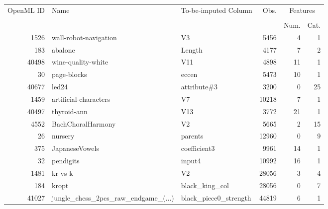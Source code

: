\begin{table}[h!]
\centering
\begin{tabular}{rllrrr}
\toprule
\multirow{2}{*}{OpenML ID} & \multirow{2}{*}{Name} & \multirow{2}{*}{To-be-imputed Column} & \multirow{2}{*}{Obs.} & \multicolumn{2}{c}{Features} \\ \cline{5-6}
\\[-0.75em]
&        &                &                            & Num.    & Cat.   \\
\midrule
      1526 &                    wall-robot-navigation &   V3 &      5456 &                4 &                1 \\
       183 &                                abalone &     Length &    4177 &                7 &                2 \\
     40498 &                     wine-quality-white &     V11 &    4898 &               11 &                1 \\
        30 &                            page-blocks &      eccen &   5473 &               10 &                1 \\
     40677 &                                  led24 &      attribute\#3 &   3200 &                0 &               25 \\
      1459 &                  artificial-characters &    V7 &    10218 &                7 &                1 \\
     40497 &                            thyroid-ann &    V13 &     3772 &               21 &                1 \\
      4552 &                      BachChoralHarmony &    V2 &     5665 &                2 &               15 \\
        26 &                                nursery &    parents &    12960 &                0 &                9 \\
       375 &                         JapaneseVowels &     coefficient3 &    9961 &               14 &                1 \\
        32 &                              pendigits &    input4 &    10992 &               16 &                1 \\
      1481 &                                kr-vs-k &     V2 &   28056 &                3 &                4 \\
       184 &                                  kropt &      black\_king\_col &  28056 &                0 &                7 \\
     41027 & jungle\_chess\_2pcs\_raw\_endgame\_(...) &    black\_piece0\_strength &    44819 &                6 &                1 \\

\end{tabular}
\end{table}
